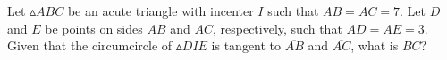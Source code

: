 Let $\vartriangle ABC$ be an acute triangle with incenter $I$ such that $AB = AC = 7$. Let $D$ and $E$ be points on sides $AB$ and $AC$, respectively, such that $AD = AE = 3$. Given that the circumcircle of $\vartriangle DIE$ is tangent to $\overline{AB}$ and $\overline{AC}$, what is $BC$?
